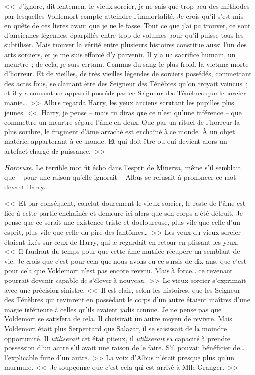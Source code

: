 <<~J'ignore, dit lentement le vieux sorcier, je ne sais que trop peu des méthodes par lesquelles Voldemort compte atteindre l'immortalité. Je crois qu'il s'est mis en quête de ces livres avant que je ne le fasse. Tout ce que j'ai pu trouver, ce sont d'anciennes légendes, éparpillés entre trop de volumes pour qu'il puisse tous les subtiliser. Mais trouver la vérité entre plusieurs histoires constitue aussi l'un des arts sorciers, et je me suis efforcé d'y parvenir. Il y a un sacrifice humain, un meurtre~; de cela, je suis certain. Commis du sang le plus froid, la victime morte d'horreur. Et de vieilles, de très vieilles légendes de sorciers possédés, commettant des actes fous, se clamant être des Seigneur des Ténèbres qu'on croyait vaincus~; et il y a souvent un appareil possédé par ce Seigneur des Ténèbres que le sorcier manie…~>> Albus regarda Harry, les yeux anciens scrutant les pupilles plus jeunes. <<~Harry, je pense -- mais tu diras que ce n'est qu'une inférence -- que commettre un meurtre sépare l'âme en deux. Que par un rituel de l'horreur la plus sombre, le fragment d'âme arraché est enchaîné à ce monde. À un objet matériel appartenant à ce monde. Et qui doit être ou qui devient alors un artefact chargé de puissance.~>>

\emph{Horcruxe}. Le terrible mot fit écho dans l'esprit de Minerva, même s'il semblait que -- pour une raison qu'elle ignorait -- Albus se refusait à prononcer ce mot devant Harry.

<<~Et par conséquent, conclut doucement le vieux sorcier, le reste de l'âme est liée à cette partie enchaînée et demeure ici alors que son corps a été détruit. Je pense que ce serait une existence triste et douloureuse, plus vile que celle d'un esprit, plus vile que celle du pire des fantômes…~>> Les yeux du vieux sorcier étaient fixés sur ceux de Harry, qui le regardait en retour en plissant les yeux. <<~Il faudrait du temps pour que cette âme mutilée récupère un semblant de vie. Je crois que c'est pour cela que nous avons eu ce sursis de dix ans, que c'est pour cela que Voldemort n'est pas encore revenu. Mais à force… ce revenant pourrait devenir capable de s'élever à nouveau.~>> Le vieux sorcier s'exprimait avec une précision sinistre. <<~Il est clair, selon les histoires, que les Seigneur des Ténèbres qui revinrent en possédant le corps d'un autre étaient maîtres d'une magie inférieure à celles qu'ils avaient jadis connue. Je ne pense pas que Voldemort se satisfera de cela. Il choisirait un autre moyen de revivre. Mais Voldemort était plus Serpentard que Salazar, il se saisissait de la moindre opportunité. Il \emph{utiliserait} cet état piteux, il \emph{utiliserait} sa capacité à prendre possession d'un autre s'il avait une raison de le faire. S'il pouvait bénéficier de… l'explicable furie d'un autre.~>> La voix d'Albus n'était presque plus qu'un murmure. <<~Je soupçonne que c'est cela qui est arrivé à Mlle Granger.~>>


